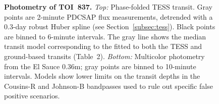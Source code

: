 \documentclass[12pt,twocolumn,tighten]{aastex63}
\newcommand{\tn}{TOI~837} %
\begin{document}
\begin{figure}[!t]
	\begin{center}
		\leavevmode
		
		\vspace{-0.6cm}
	\end{center}
	\vspace{-0.7cm}
  \caption{
    {\bf Photometry of \tn.} {\it Top:}
    Phase-folded TESS transit. Gray points are 2-minute PDCSAP flux
    measurements, detrended with a 0.3-day robust Huber spline (see
    Section~\ref{subsec:tess}).  Black points are binned to 6-minute
    intervals.  The gray line shows the median transit model corresponding to the
    fitted to both the TESS and ground-based transits
    (Table~2).  {\it Bottom:} Multicolor
    photometry from the El Sauce 0.36m; gray points are binned to 10-minute intervals.  Models
    show lower limits on the transit depths in 
    the Cousins-R and Johnson-B bandpasses used to rule out specific false positive scenarios.
    \label{fig:jointphot}
	}
\end{figure}
\end{document}
